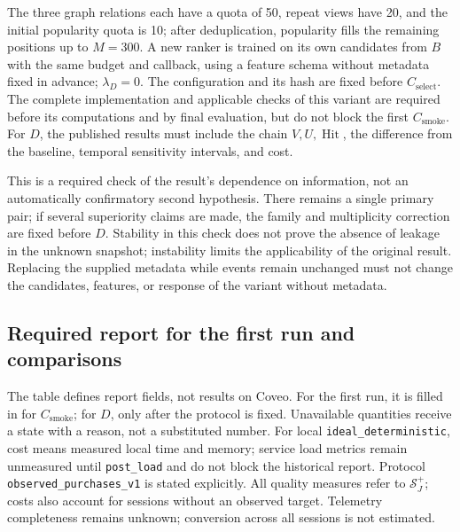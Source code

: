 \documentclass[12pt,a4paper]{article}
\newcommand{\code}[1]{{\ttfamily\small\nolinkurl{#1}}}
\theoremstyle{plainru}
\begin{document}
The three graph relations each have a quota of 50, repeat views have
20, and the initial popularity quota is 10; after deduplication,
popularity fills the remaining positions up to $M=300$. A new ranker
is trained on its own candidates from $B$ with the same budget and callback,
using a feature schema without metadata fixed in advance; $\lambda_D=0$.
The configuration and its hash are fixed before $C_{\mathrm{select}}$.
The complete implementation and applicable checks of this variant are required
before its computations and by final evaluation, but do not block the first $C_{\mathrm{smoke}}$.
For $D$, the published results must include the chain $V,U,\operatorname{Hit}$,
the difference from the baseline, temporal sensitivity intervals, and cost.

This is a required check of the result's dependence on information,
not an automatically confirmatory second hypothesis. There remains a single primary
pair; if several superiority claims are made, the family and multiplicity correction
are fixed before $D$. Stability in this
check does not prove the absence of leakage in the unknown snapshot;
instability limits the applicability of the original result.
Replacing the supplied metadata while events remain unchanged must not
change the candidates, features, or response of the variant without metadata.

\subsection{Required report for the first run and comparisons}\label{app:diagnostic-output}

The table defines report fields, not results on Coveo. For the first run,
it is filled in for $C_{\mathrm{smoke}}$; for $D$, only after the protocol is fixed. Unavailable
quantities receive a state with a reason, not a substituted number.
For local \code{ideal_deterministic}, cost means measured
local time and memory; service load metrics remain
unmeasured until \code{post_load} and do not block the historical report.
Protocol \code{observed_purchases_v1} is stated explicitly.
All quality measures refer to $\mathcal S_J^+$; costs
also account for sessions without an observed target. Telemetry completeness
remains unknown; conversion across all sessions is not estimated.
\end{document}
